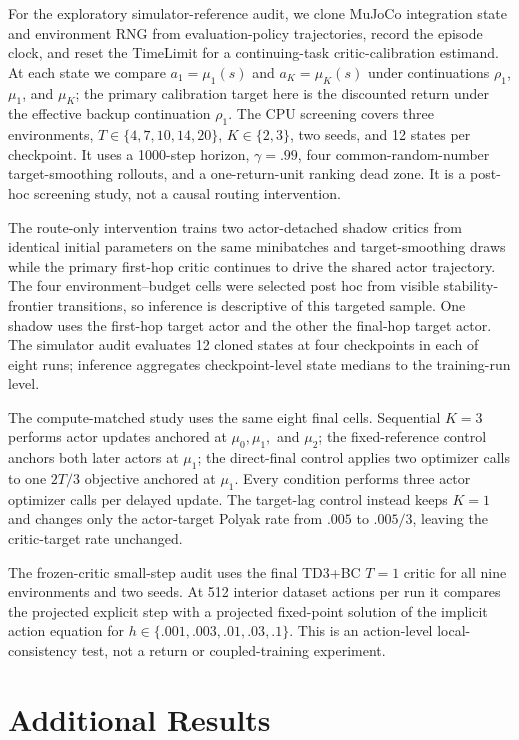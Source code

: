 \documentclass[letterpaper]{article}
\begin{document}
For the exploratory simulator-reference audit, we clone MuJoCo integration
state and environment RNG from evaluation-policy trajectories, record the
episode clock, and reset the TimeLimit for a continuing-task critic-calibration
estimand. At each state we compare $a_1=\mu_1(s)$ and
$a_K=\mu_K(s)$ under continuations $\rho_1$, $\mu_1$, and $\mu_K$; the
primary calibration target here is the discounted return under the effective
backup continuation $\rho_1$. The CPU screening covers three environments,
$T\in\{4,7,10,14,20\}$, $K\in\{2,3\}$, two seeds, and 12 states per
checkpoint. It uses a 1000-step horizon, $\gamma=.99$, four common-random-number
target-smoothing rollouts, and a one-return-unit ranking dead zone. It is a
post-hoc screening study, not a causal routing intervention.

The route-only intervention trains two actor-detached shadow critics from identical initial parameters on the same minibatches and target-smoothing draws while the primary first-hop critic continues to drive the shared actor trajectory. The four environment--budget cells were selected post hoc from visible stability-frontier transitions, so inference is descriptive of this targeted sample. One shadow uses the first-hop target actor and the other the final-hop target actor. The simulator audit evaluates 12 cloned states at four checkpoints in each of eight runs; inference aggregates checkpoint-level state medians to the training-run level.

The compute-matched study uses the same eight final cells. Sequential $K=3$ performs actor updates anchored at $\mu_0,\mu_1,$ and $\mu_2$; the fixed-reference control anchors both later actors at $\mu_1$; the direct-final control applies two optimizer calls to one $2T/3$ objective anchored at $\mu_1$. Every condition performs three actor optimizer calls per delayed update. The target-lag control instead keeps $K=1$ and changes only the actor-target Polyak rate from $.005$ to $.005/3$, leaving the critic-target rate unchanged.

The frozen-critic small-step audit uses the final TD3+BC $T=1$ critic for all nine environments and two seeds. At 512 interior dataset actions per run it compares the projected explicit step with a projected fixed-point solution of the implicit action equation for $h\in\{.001,.003,.01,.03,.1\}$. This is an action-level local-consistency test, not a return or coupled-training experiment.

\section{Additional Results}
\label{app:results}
\end{document}
